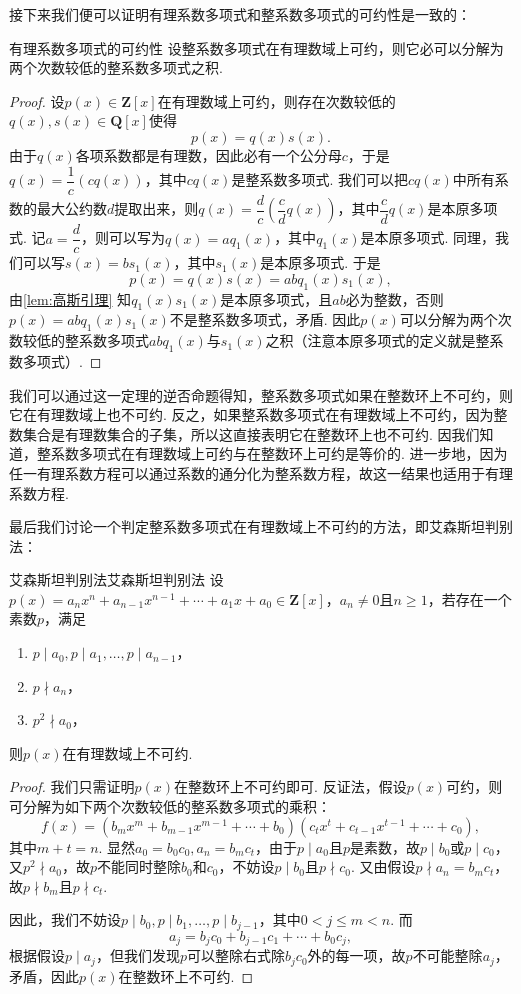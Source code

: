 接下来我们便可以证明有理系数多项式和整系数多项式的可约性是一致的：
\begin{theorem}{}{有理系数多项式的可约性}
    设整系数多项式在有理数域上可约，则它必可以分解为两个次数较低的整系数多项式之积.
\end{theorem}
\begin{proof}
    设$p(x)\in\mathbf{Z}[x]$在有理数域上可约，则存在次数较低的$q(x),s(x)\in\mathbf{Q}[x]$使得
    \[p(x)=q(x)s(x).\]
    由于$q(x)$各项系数都是有理数，因此必有一个公分母$c$，于是$q(x)=\dfrac{1}{c}(cq(x))$，其中$cq(x)$是整系数多项式. 我们可以把$cq(x)$中所有系数的最大公约数$d$提取出来，则$q(x)=\dfrac{d}{c}(\dfrac{c}{d}q(x))$，其中$\dfrac{c}{d}q(x)$是本原多项式. 记$a=\dfrac{d}{c}$，则可以写为$q(x)=aq_1(x)$，其中$q_1(x)$是本原多项式. 同理，我们可以写$s(x)=bs_1(x)$，其中$s_1(x)$是本原多项式. 于是
    \[p(x)=q(x)s(x)=abq_1(x)s_1(x),\]
    由\autoref{lem:高斯引理} 知$q_1(x)s_1(x)$是本原多项式，且$ab$必为整数，否则$p(x)=abq_1(x)s_1(x)$不是整系数多项式，矛盾. 因此$p(x)$可以分解为两个次数较低的整系数多项式$abq_1(x)$与$s_1(x)$之积（注意本原多项式的定义就是整系数多项式）.
\end{proof}

我们可以通过这一定理的逆否命题得知，整系数多项式如果在整数环上不可约，则它在有理数域上也不可约. 反之，如果整系数多项式在有理数域上不可约，因为整数集合是有理数集合的子集，所以这直接表明它在整数环上也不可约. 因我们知道，整系数多项式在有理数域上可约与在整数环上可约是等价的. 进一步地，因为任一有理系数方程可以通过系数的通分化为整系数方程，故这一结果也适用于有理系数方程.

最后我们讨论一个判定整系数多项式在有理数域上不可约的方法，即艾森斯坦判别法：
\begin{theorem}{艾森斯坦判别法}{艾森斯坦判别法}
    设$p(x)=a_nx^n+a_{n-1}x^{n-1}+\cdots+a_1x+a_0\in\mathbf{Z}[x]$，$a_n\neq 0$且$n\geqslant 1$，若存在一个素数$p$，满足
    \begin{enumerate}
        \item $p\mid a_0,p\mid a_1,\ldots,p\mid a_{n-1}$，
        \item $p\nmid a_n$，
        \item $p^2\nmid a_0$，
    \end{enumerate}
    则$p(x)$在有理数域上不可约.
\end{theorem}
\begin{proof}
    我们只需证明$p(x)$在整数环上不可约即可. 反证法，假设$p(x)$可约，则可分解为如下两个次数较低的整系数多项式的乘积：
    \[f(x)=(b_mx^m+b_{m-1}x^{m-1}+\cdots+b_0)(c_tx^t+c_{t-1}x^{t-1}+\cdots+c_0),\]
    其中$m+t=n$. 显然$a_0=b_0c_0,a_n=b_mc_t$，由于$p\mid a_0$且$p$是素数，故$p\mid b_0$或$p\mid c_0$，又$p^2\nmid a_0$，故$p$不能同时整除$b_0$和$c_0$，不妨设$p\mid b_0$且$p\nmid c_0$. 又由假设$p\nmid a_n=b_mc_t$，故$p\nmid b_m$且$p\nmid c_t$.

    因此，我们不妨设$p\mid b_0,p\mid b_1,\ldots,p\mid b_{j-1}$，其中$0<j\leqslant m<n$. 而
    \[a_j=b_jc_0+b_{j-1}c_1+\cdots+b_0c_j,\]
    根据假设$p\mid a_j$，但我们发现$p$可以整除右式除$b_jc_0$外的每一项，故$p$不可能整除$a_j$，矛盾，因此$p(x)$在整数环上不可约.
\end{proof}

